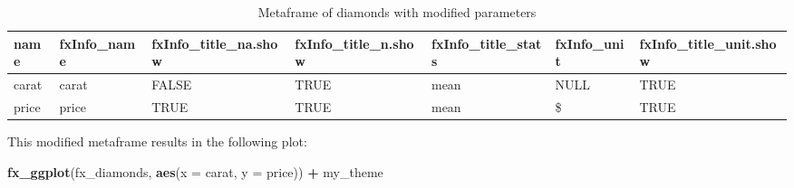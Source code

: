 \documentclass[]{report}
\newenvironment{Shaded}{\begin{snugshade}}{\end{snugshade}}
\newcommand{\KeywordTok}[1]{\textcolor[rgb]{0.13,0.29,0.53}{\textbf{#1}}}
\newcommand{\DataTypeTok}[1]{\textcolor[rgb]{0.13,0.29,0.53}{#1}}
\newcommand{\StringTok}[1]{\textcolor[rgb]{0.31,0.60,0.02}{#1}}
\newcommand{\OtherTok}[1]{\textcolor[rgb]{0.56,0.35,0.01}{#1}}
\newcommand{\ControlFlowTok}[1]{\textcolor[rgb]{0.13,0.29,0.53}{\textbf{#1}}}
\newcommand{\OperatorTok}[1]{\textcolor[rgb]{0.81,0.36,0.00}{\textbf{#1}}}
\newcommand{\NormalTok}[1]{#1}
\theoremstyle{definition}
\theoremstyle{definition}
\theoremstyle{definition}
\theoremstyle{remark}
\begin{document}
\begin{Shaded}
\end{Shaded}

\begin{table}

\caption{\label{tab:title-ex}Metaframe of diamonds with modified parameters}
\centering
\begin{tabular}[t]{lllllll}
\toprule
name & fxInfo\_name & fxInfo\_title\_na.show & fxInfo\_title\_n.show & fxInfo\_title\_stats & fxInfo\_unit & fxInfo\_title\_unit.show\\
\midrule
carat & carat & FALSE & TRUE & mean & NULL & TRUE\\
price & price & TRUE & TRUE & mean & \$ & TRUE\\
\bottomrule
\end{tabular}
\end{table}

This modified metaframe results in the following plot:

\begin{Shaded}
\begin{Highlighting}[]
\KeywordTok{fx_ggplot}\NormalTok{(fx_diamonds, }\KeywordTok{aes}\NormalTok{(}\DataTypeTok{x =}\NormalTok{ carat, }\DataTypeTok{y =}\NormalTok{ price)) }\OperatorTok{+}\StringTok{ }
\StringTok{  }\NormalTok{my_theme}
\end{Highlighting}
\end{Shaded}
\end{document}
